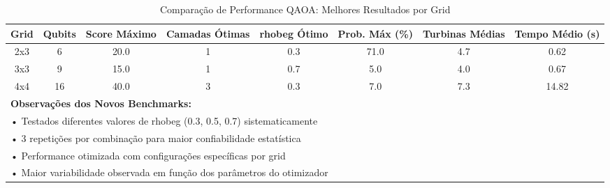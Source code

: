 \begin{table*}[htbp]
\centering
\caption{Comparação de Performance QAOA: Melhores Resultados por Grid}
\label{tab:benchmark_comparison}
\footnotesize
\begin{tabular}{|c|c|c|c|c|c|c|c|}
\hline
\textbf{Grid} & \textbf{Qubits} & \textbf{Score Máximo} & \textbf{Camadas Ótimas} & \textbf{rhobeg Ótimo} & \textbf{Prob. Máx (\%)} & \textbf{Turbinas Médias} & \textbf{Tempo Médio (s)} \\
\hline
2x3 & 6 & 20.0 & 1 & 0.3 & 71.0 & 4.7 & 0.62 \\
3x3 & 9 & 15.0 & 1 & 0.7 & 5.0 & 4.0 & 0.67 \\
4x4 & 16 & 40.0 & 3 & 0.3 & 7.0 & 7.3 & 14.82 \\
\hline
\multicolumn{8}{|l|}{\textbf{Observações dos Novos Benchmarks:}} \\
\multicolumn{8}{|l|}{• Testados diferentes valores de rhobeg (0.3, 0.5, 0.7) sistematicamente} \\
\multicolumn{8}{|l|}{• 3 repetições por combinação para maior confiabilidade estatística} \\
\multicolumn{8}{|l|}{• Performance otimizada com configurações específicas por grid} \\
\multicolumn{8}{|l|}{• Maior variabilidade observada em função dos parâmetros do otimizador} \\
\end{tabular}
\end{table*}